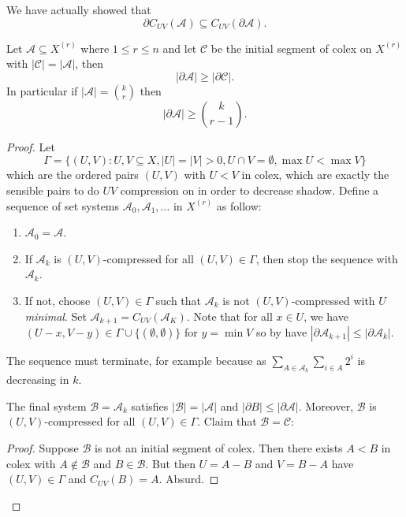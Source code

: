 \documentclass[a4paper]{article}
\newcommand{\shadow}{\partial}
\begin{document}
\begin{remark}
  We have actually showed that
  \[
    \shadow C_{UV}(\mathcal A) \subseteq C_{UV}(\shadow \mathcal A).
  \]
\end{remark}

\begin{theorem}
  \label{thm:Krustal-Katona}
  Let \(\mathcal A \subseteq X^{(r)}\) where \(1 \leq r \leq n\) and let \(\mathcal C\) be the initial segment of colex on \(X^{(r)}\) with \(|\mathcal C| = |\mathcal A|\), then
  \[
    |\shadow \mathcal A| \geq |\shadow \mathcal C|.
  \]
  In particular if \(|\mathcal A| = \binom{k}{r}\) then
  \[
    |\shadow \mathcal A| \geq \binom{k}{r - 1}.
  \]
\end{theorem}

\begin{proof}
  Let
  \[
    \Gamma = \{(U, V): U, V \subseteq X, |U| = |V| > 0, U \cap V = \emptyset, \max U < \max V\}
  \]
  which are the ordered pairs \((U, V)\) with \(U < V\) in colex, which are exactly the sensible pairs to do \(UV\) compression on in order to decrease shadow. Define a sequence of set systems \(\mathcal A_0, \mathcal A_1, \dots\) in \(X^{(r)}\) as follow:
  \begin{enumerate}
  \item \(\mathcal A_0 = \mathcal A\).
  \item If \(\mathcal A_k\) is \((U, V)\)-compressed for all \((U, V) \in \Gamma\), then stop the sequence with \(\mathcal A_k\).
  \item If not, choose \((U, V) \in \Gamma\) such that \(\mathcal A_k\) is not \((U, V)\)-compressed with \(U\) \emph{minimal}. Set \(\mathcal A_{k + 1} = C_{UV}(\mathcal A_K)\). Note that for all \(x \in U\), we have \((U - x, V - y) \in \Gamma \cup \{(\emptyset, \emptyset)\}\) for \(y = \min V\) so by  have \(|\shadow \mathcal A_{k + 1}| \leq |\shadow \mathcal A_k|\).
  \end{enumerate}

  The sequence must terminate, for example because as \(\sum_{A \in \mathcal A_k}\sum_{i \in A} 2^i\) is decreasing in \(k\).

  The final system \(\mathcal B = \mathcal A_k\) satisfies \(|\mathcal B| = |\mathcal A|\) and \(|\shadow B| \leq |\shadow \mathcal A|\). Moreover, \(\mathcal B\) is \((U, V)\)-compressed for all \((U, V) \in \Gamma\). Claim that \(\mathcal B = \mathcal C\):
  \begin{proof}
    Suppose \(\mathcal B\) is not an initial segment of colex. Then there exists \(A < B\) in colex with \(A \notin \mathcal B\) and \(B \in \mathcal B\). But then \(U = A - B\) and \(V = B - A\) have \((U, V) \in \Gamma\) and \(C_{UV}(B) = A\). Absurd.
  \end{proof}
\end{proof}
\end{document}
